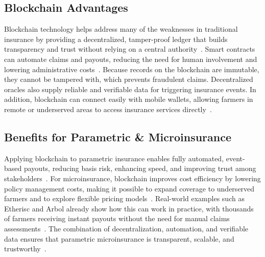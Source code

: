 \documentclass[11pt,a4paper]{article}
\begin{document}
		\subsection{Blockchain Advantages}\label{subsec:blockchain-advantages}
		Blockchain technology helps address many of the weaknesses in traditional insurance by providing a decentralized, tamper-proof ledger that builds transparency and trust without relying on a central authority~\parencite{Shetty2022}.
		Smart contracts can automate claims and payouts, reducing the need for human involvement and lowering administrative costs~\parencite{Chainlink2021, DominguezAnguianoParte2024}.
		Because records on the blockchain are immutable, they cannot be tampered with, which prevents fraudulent claims.
		Decentralized oracles also supply reliable and verifiable data for triggering insurance events.
		In addition, blockchain can connect easily with mobile wallets, allowing farmers in remote or underserved areas to access insurance services directly~\parencite{DominguezAnguianoParte2024}.

		\subsection{Benefits for Parametric \& Microinsurance}\label{subsec:benefits-for-parametric-&-microinsurance}
		Applying blockchain to parametric insurance enables fully automated, event-based payouts, reducing basis risk, enhancing speed, and improving trust among stakeholders~\parencite{Chainlink2021, ParametricInsured2025, Shetty2022}.
		For microinsurance, blockchain improves cost efficiency by lowering policy management costs, making it possible to expand coverage to underserved farmers and to explore flexible pricing models~\parencite{DominguezAnguianoParte2024, ResearchGate2023}.
		Real-world examples such as Etherisc and Arbol already show how this can work in practice, with thousands of farmers receiving instant payouts without the need for manual claims assessments~\parencite{Alsdorf2024, DominguezAnguianoParte2024, ParametricInsured2025}.
		The combination of decentralization, automation, and verifiable data ensures that parametric microinsurance is transparent, scalable, and trustworthy~\parencite{Shetty2022}.
\end{document}
